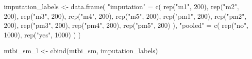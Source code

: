 \documentclass[
  letterpaper,
  DIV=11,
  numbers=noendperiod]{scrreprt}
\newenvironment{Shaded}{\begin{snugshade}}{\end{snugshade}}
\newcommand{\DecValTok}[1]{\textcolor[rgb]{0.68,0.00,0.00}{#1}}
\newcommand{\FunctionTok}[1]{\textcolor[rgb]{0.28,0.35,0.67}{#1}}
\newcommand{\NormalTok}[1]{\textcolor[rgb]{0.00,0.23,0.31}{#1}}
\newcommand{\OtherTok}[1]{\textcolor[rgb]{0.00,0.23,0.31}{#1}}
\newcommand{\StringTok}[1]{\textcolor[rgb]{0.13,0.47,0.30}{#1}}
\begin{document}
\begin{Shaded}
\begin{Highlighting}[]
\NormalTok{imputation\_labels }\OtherTok{\textless{}{-}} \FunctionTok{data.frame}\NormalTok{(}
    \StringTok{"imputation"} \OtherTok{=} \FunctionTok{c}\NormalTok{(}
        \FunctionTok{rep}\NormalTok{(}\StringTok{"m1"}\NormalTok{, }\DecValTok{200}\NormalTok{),}
        \FunctionTok{rep}\NormalTok{(}\StringTok{"m2"}\NormalTok{, }\DecValTok{200}\NormalTok{),}
        \FunctionTok{rep}\NormalTok{(}\StringTok{"m3"}\NormalTok{, }\DecValTok{200}\NormalTok{),}
        \FunctionTok{rep}\NormalTok{(}\StringTok{"m4"}\NormalTok{, }\DecValTok{200}\NormalTok{),}
        \FunctionTok{rep}\NormalTok{(}\StringTok{"m5"}\NormalTok{, }\DecValTok{200}\NormalTok{),}
        \FunctionTok{rep}\NormalTok{(}\StringTok{"pm1"}\NormalTok{, }\DecValTok{200}\NormalTok{),}
        \FunctionTok{rep}\NormalTok{(}\StringTok{"pm2"}\NormalTok{, }\DecValTok{200}\NormalTok{),}
        \FunctionTok{rep}\NormalTok{(}\StringTok{"pm3"}\NormalTok{, }\DecValTok{200}\NormalTok{),}
        \FunctionTok{rep}\NormalTok{(}\StringTok{"pm4"}\NormalTok{, }\DecValTok{200}\NormalTok{),}
        \FunctionTok{rep}\NormalTok{(}\StringTok{"pm5"}\NormalTok{, }\DecValTok{200}\NormalTok{)}
\NormalTok{    ),}
    \StringTok{"pooled"} \OtherTok{=} \FunctionTok{c}\NormalTok{(}
        \FunctionTok{rep}\NormalTok{(}\StringTok{"no"}\NormalTok{, }\DecValTok{1000}\NormalTok{),}
        \FunctionTok{rep}\NormalTok{(}\StringTok{"yes"}\NormalTok{, }\DecValTok{1000}\NormalTok{)}
\NormalTok{    )}
\NormalTok{)}

\NormalTok{mtbi\_sm\_l }\OtherTok{\textless{}{-}} \FunctionTok{cbind}\NormalTok{(mtbi\_sm, imputation\_labels)}


\end{Highlighting}
\end{Shaded}
\end{document}
